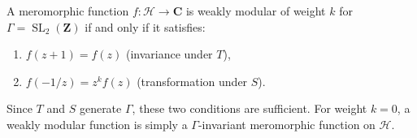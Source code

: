A meromorphic function $f: \mathcal{H} \to \mathbf{C}$ is weakly modular of weight $k$ for $\Gamma = \operatorname{SL}_2(\mathbf{Z})$ if and only if it satisfies:
\begin{enumerate}
\item[(i)] $f(z+1) = f(z)$ (invariance under $T$),
\item[(ii)] $f(-1/z) = z^k f(z)$ (transformation under $S$).
\end{enumerate}
Since $T$ and $S$ generate $\Gamma$, these two conditions are sufficient. For weight $k=0$, a weakly modular function is simply a $\Gamma$-invariant meromorphic function on $\mathcal{H}$.
